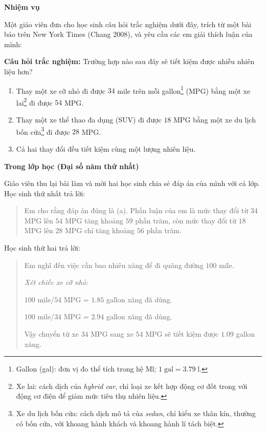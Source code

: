   {
    \textbf{Nhiệm vụ}

    Một giáo viên đưa cho học sinh câu hỏi trắc nghiệm dưới đây, trích từ một bài báo trên New York Times (Chang 2008), và yêu cầu các em giải thích luận của mình:

    \textbf{Câu hỏi trắc nghiệm:} Trường hợp nào sau đây sẽ tiết kiệm được nhiều nhiên liệu hơn?

    \begin{enumerate}
      \item [(a)] Thay một xe cỡ nhỏ đi được $34$ mile trên mỗi gallon\footnote{Gallon (gal): đơn vị đo thể tích trong hệ Mĩ; $1\;\text{gal}=3.79\;\text{l}$.} (MPG) bằng một xe lai\footnote{Xe lai: cách dịch của \emph{hybrid car}, chỉ loại xe kết hợp động cơ đốt trong với động cơ điện để giảm mức tiêu thụ nhiên liệu.} đi được $54$ MPG.

      \item [(b)] Thay một xe thể thao đa dụng (SUV) đi được $18$ MPG bằng một xe du lịch bốn cửa\footnote{Xe du lịch bốn cửa: cách dịch mô tả của \emph{sedan}, chỉ kiểu xe thân kín, thường có bốn cửa, với khoang hành khách và khoang hành lí tách biệt.} đi được $28$ MPG.

      \item [(c)] Cả hai thay đổi đều tiết kiệm cùng một lượng nhiên liệu.
    \end{enumerate}

    \textbf{Trong lớp học (Đại số năm thứ nhất)}

    Giáo viên thu lại bài làm và mời hai học sinh chia sẻ đáp án của mình với cả lớp. Học sinh thứ nhất trả lời:

    \begin{quote}
      Em cho rằng đáp án đúng là (a). Phần luận của em là mức thay đổi từ $34$ MPG lên $54$ MPG tăng khoảng $59$ phần trăm, còn mức thay đổi từ $18$ MPG lên $28$ MPG chỉ tăng khoảng $56$ phần trăm.
    \end{quote}

    Học sinh thứ hai trả lời:

    \begin{quote}
      Em nghĩ đến việc cần bao nhiêu xăng để đi quãng đường $100$ mile.

      \emph{Xét chiếc xe cỡ nhỏ:}

      $100$ mile/$54$ MPG = $1.85$ gallon xăng đã dùng.

      $100$ mile/$34$ MPG = $2.94$ gallon xăng đã dùng. 

      Vậy chuyển từ xe $34$ MPG sang xe $54$ MPG sẽ tiết kiệm được $1.09$ gallon xăng.


\end{quote}}
